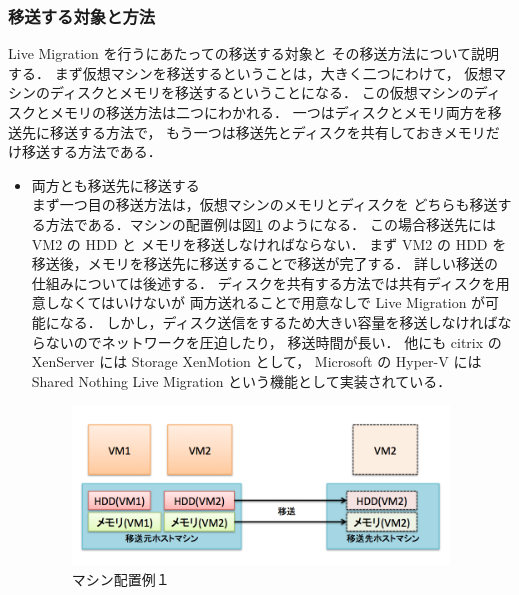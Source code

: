 \documentclass[graduation-thesis]{mlarticle}
\begin{document}
\subsubsection{移送する対象と方法}
\label{sec-2-3-3}
Live Migration を行うにあたっての移送する対象と
その移送方法について説明する．
まず仮想マシンを移送するということは，大きく二つにわけて，
仮想マシンのディスクとメモリを移送するということになる．
この仮想マシンのディスクとメモリの移送方法は二つにわかれる．
一つはディスクとメモリ両方を移送先に移送する方法で，
もう一つは移送先とディスクを共有しておきメモリだけ移送する方法である．
\begin{itemize}
\item 両方とも移送先に移送する\\
      まず一つ目の移送方法は，仮想マシンのメモリとディスクを
どちらも移送する方法である．マシンの配置例は図\ref{arrangement1}
のようになる．
この場合移送先には VM2 の HDD と メモリを移送しなければならない．
まず VM2 の HDD を移送後，メモリを移送先に移送することで移送が完了する．
詳しい移送の仕組みについては後述する．
ディスクを共有する方法では共有ディスクを用意しなくてはいけないが
両方送れることで用意なしで Live Migration が可能になる．
しかし，ディスク送信をするため大きい容量を移送しなければならないのでネットワークを圧迫したり，
移送時間が長い．
他にも citrix の XenServer には Storage XenMotion \cite{Citrix:2011:SXL} として，
Microsoft の Hyper-V には Shared Nothing Live Migration という機能として実装されている．

\begin{figure}[H]\begin{center}\includegraphics[width=10.0cm]{./img/arrangement1.png}\caption{ マシン配置例１}\label{arrangement1}\end{center}\end{figure}


\end{itemize}
\end{document}
